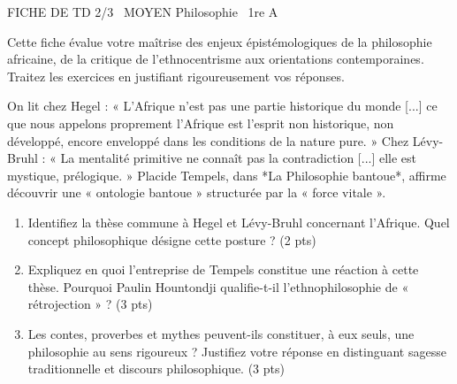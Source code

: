 \documentclass[11pt]{article}
\begin{document}
\begin{tcolorbox}[enhanced,colback=popink,colframe=popink,arc=10pt,boxrule=0pt,left=12pt,right=12pt,top=9pt,bottom=9pt]
{\color{white}\popxbold\small FICHE DE TD 2/3 \textbullet\ MOYEN \hfill Philosophie \textbullet\ 1re A\par}
\end{tcolorbox}
\vspace{4pt}
Cette fiche évalue votre maîtrise des enjeux épistémologiques de la philosophie africaine, de la critique de l'ethnocentrisme aux orientations contemporaines. Traitez les exercices en justifiant rigoureusement vos réponses.

\begin{exercice}
On lit chez Hegel : « L'Afrique n'est pas une partie historique du monde [...] ce que nous appelons proprement l'Afrique est l'esprit non historique, non développé, encore enveloppé dans les conditions de la nature pure. » Chez Lévy-Bruhl : « La mentalité primitive ne connaît pas la contradiction [...] elle est mystique, prélogique. » Placide Tempels, dans *La Philosophie bantoue*, affirme découvrir une « ontologie bantoue » structurée par la « force vitale ».
\begin{enumerate}
    \item Identifiez la thèse commune à Hegel et Lévy-Bruhl concernant l'Afrique. Quel concept philosophique désigne cette posture ? (2 pts)
    \item Expliquez en quoi l'entreprise de Tempels constitue une réaction à cette thèse. Pourquoi Paulin Hountondji qualifie-t-il l'ethnophilosophie de « rétrojection » ? (3 pts)
    \item Les contes, proverbes et mythes peuvent-ils constituer, à eux seuls, une philosophie au sens rigoureux ? Justifiez votre réponse en distinguant sagesse traditionnelle et discours philosophique. (3 pts)
\end{enumerate}
\end{exercice}
\end{document}
